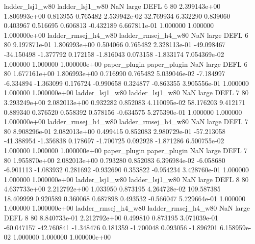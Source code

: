     ladder_lsj1_w80     ladder_lsj1_w80                   NaN      large     DEFL                 6 80 2.399143e+00   1.806993e+00      0.813955       0.765482  2.539942e-02     32.769934      6.332290     0.839060       0.403967  0.516695   0.606813    -0.432189   6.667811e-01            1.000000        1.000000        1.000000e+00
ladder_rmsej_h4_w80 ladder_rmsej_h4_w80                   NaN      large     DEFL                 6 80 9.197871e-01   1.806993e+00      0.504066       0.765482  2.328113e-01    -49.098467    -34.150498    -1.377792       0.172158 -1.816043   0.073158    -1.833174   7.054369e-02            1.000000        1.000000        1.000000e+00
       paper_plugin        paper_plugin                   NaN      large     DEFL                 6 80 1.677161e+00   1.806993e+00      0.716990       0.765482  5.039046e-02     -7.184997     -6.334894    -1.363099       0.176724 -0.990658   0.324877    -0.863355   3.905556e-01            1.000000        1.000000        1.000000e+00
    ladder_lsj1_w80     ladder_lsj1_w80                   NaN      large     DEFL                 7 80 3.293249e+00   2.082013e+00      0.932282       0.852083  4.110095e-02     58.176203      9.412171     0.889340       0.376520  0.558392   0.578156    -0.634575   5.275390e-01            1.000000        1.000000        1.000000e+00
ladder_rmsej_h4_w80 ladder_rmsej_h4_w80                   NaN      large     DEFL                 7 80 8.908296e-01   2.082013e+00      0.499415       0.852083  2.980729e-01    -57.213058    -41.388954    -1.356838       0.178697 -1.700725   0.092928    -1.871286   6.500755e-02            1.000000        1.000000        1.000000e+00
       paper_plugin        paper_plugin                   NaN      large     DEFL                 7 80 1.955870e+00   2.082013e+00      0.793280       0.852083  6.396984e-02     -6.058680     -6.901113    -1.083932       0.281692 -0.932690   0.353822    -0.954234   3.428760e-01            1.000000        1.000000        1.000000e+00
    ladder_lsj1_w80     ladder_lsj1_w80                   NaN      large     DEFL                 8 80 4.637733e+00   2.212792e+00      1.033950       0.873195  4.264728e-02    109.587385     18.409999     0.920589       0.360068  0.687898   0.493532    -0.566047   5.729664e-01            1.000000        1.000000        1.000000e+00
ladder_rmsej_h4_w80 ladder_rmsej_h4_w80                   NaN      large     DEFL                 8 80 8.840733e-01   2.212792e+00      0.499810       0.873195  3.071039e-01    -60.047157    -42.760841    -1.348476       0.181359 -1.700048   0.093056    -1.896201   6.158959e-02            1.000000        1.000000        1.000000e+00
